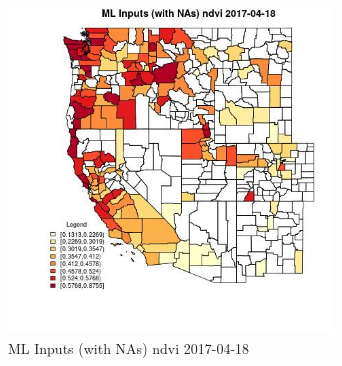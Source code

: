 \begin{figure} 
\centering  
\includegraphics[width=0.77\textwidth]{Code_Outputs/Report_ML_input_PM25_Step4_part_e_de_duplicated_aves_compiled_2019-05-21wNAs_CountyndviMean2017-04-18.jpg} 
\caption{\label{fig:Report_ML_input_PM25_Step4_part_e_de_duplicated_aves_compiled_2019-05-21wNAsCountyndviMean2017-04-18}ML Inputs (with NAs) ndvi 2017-04-18} 
\end{figure} 
 
